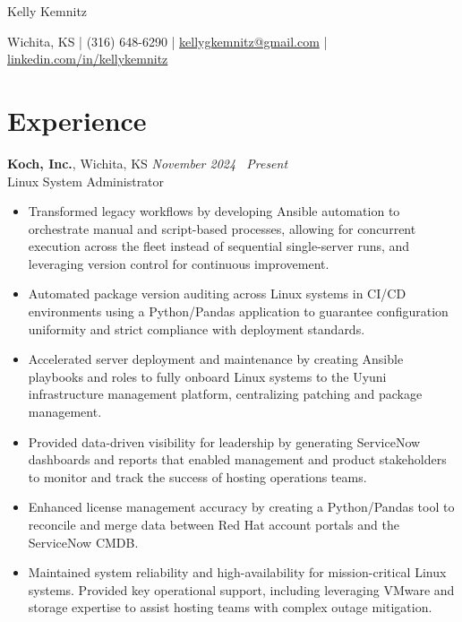 \documentclass[10pt]{article}       %
\begin{document}
\centerline{\Huge Kelly Kemnitz}

\vspace{5pt}

\centerline{\large Wichita, KS | (316) 648-6290 | \href{mailto:kellygkemnitz@gmail.com}{kellygkemnitz@gmail.com} | \href{https://www.linkedin.com/in/kellykemnitz/}{linkedin.com/in/kellykemnitz}}

\vspace{-10pt}

\section*{Experience}
\textbf{Koch, Inc.}, Wichita, KS \hfill \textit{November 2024 \textendash\ Present} \\
\vspace{1pt}
Linux System Administrator \\
\begin{itemize}
  \item Transformed legacy workflows by developing Ansible automation to orchestrate manual and script-based processes, allowing for concurrent execution across the fleet instead of sequential single-server runs, and leveraging version control for continuous improvement.
  \item Automated package version auditing across Linux systems in CI/CD environments using a Python/Pandas application to guarantee configuration uniformity and strict compliance with deployment standards.
  \item Accelerated server deployment and maintenance by creating Ansible playbooks and roles to fully onboard Linux systems to the Uyuni infrastructure management platform, centralizing patching and package management.
  \item Provided data-driven visibility for leadership by generating ServiceNow dashboards and reports that enabled management and product stakeholders to monitor and track the success of hosting operations teams.
  \item Enhanced license management accuracy by creating a Python/Pandas tool to reconcile and merge data between Red Hat account portals and the ServiceNow CMDB.
  \item Maintained system reliability and high-availability for mission-critical Linux systems. Provided key operational support, including leveraging VMware and storage expertise to assist hosting teams with complex outage mitigation.
\end{itemize}
\end{document}
